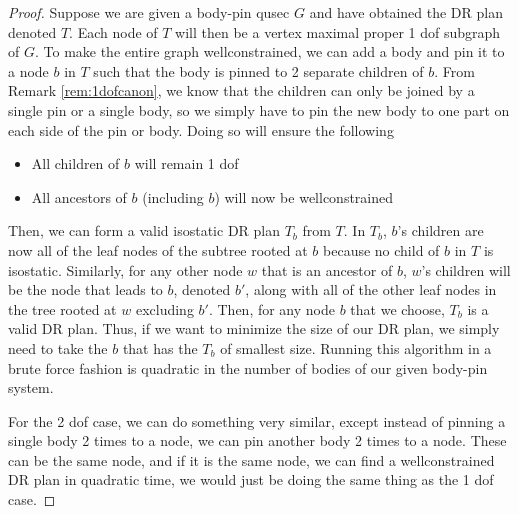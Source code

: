 \begin{proof}
    Suppose we are given a body-pin qusec $G$ and have obtained the DR plan denoted $T$. Each node of $T$ will then be a vertex maximal proper 1 dof subgraph of $G$. To make the entire graph wellconstrained, we can add a body and pin it to a node $b$ in $T$ such that the body is pinned to 2 separate children of $b$. From Remark \ref{rem:1dofcanon}, we know that the children can only be joined by a single pin or a single body, so we simply have to pin the new body to one part on each side of the pin or body. Doing so will ensure the following

    \begin{itemize}
        \item All children of $b$ will remain 1 dof
        \item All ancestors of $b$ (including $b$) will now be wellconstrained
    \end{itemize}

    Then, we can form a valid isostatic DR plan $T_b$ from $T$. In $T_b$, $b$'s children are now all of the leaf nodes of the subtree rooted at $b$ because no child of $b$ in $T$ is isostatic. Similarly, for any other node $w$ that is an ancestor of $b$, $w$'s children will be the node that leads to $b$, denoted $b'$, along with all of the other leaf nodes in the tree rooted at $w$ excluding $b'$. Then, for any node $b$ that we choose, $T_b$ is a valid DR plan. Thus, if we want to minimize the size of our DR plan, we simply need to take the $b$ that has the $T_b$ of smallest size. Running this algorithm in a brute force fashion is quadratic in the number of bodies of our given body-pin system.

    For the 2 dof case, we can do something very similar, except instead of pinning a single body 2 times to a node, we can pin another body 2 times to a node. These can be the same node, and if it is the same node, we can find a wellconstrained DR plan in quadratic time, we would just be doing the same thing as the 1 dof case.
\end{proof}
